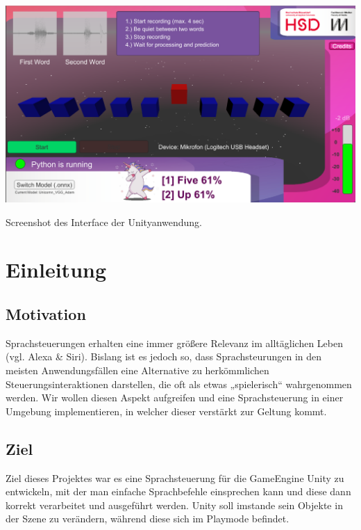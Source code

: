 \documentclass[sigconf]{acmart}
\begin{document}
\begin{teaserfigure}
  \includegraphics[width=\textwidth]{images/Demo}
  \caption{Screenshot des Interface der Unityanwendung.}
  \label{fig:UnityApp}
\end{teaserfigure}

\maketitle
\newpage
\section{Einleitung}

\subsection{Motivation}
Sprachsteuerungen erhalten eine immer größere Relevanz im alltäglichen Leben (vgl. Alexa \& Siri). Bislang ist es jedoch so, dass Sprachsteurungen in den meisten Anwendungsfällen eine Alternative zu herkömmlichen Steuerungsinteraktionen darstellen, die oft als etwas „spielerisch“ wahrgenommen werden. Wir wollen diesen Aspekt aufgreifen und eine Sprachsteuerung in einer Umgebung implementieren, in welcher dieser verstärkt zur Geltung kommt.

\subsection{Ziel}
Ziel dieses Projektes war es eine Sprachsteuerung für die GameEngine Unity zu entwickeln, mit der man einfache Sprachbefehle einsprechen kann und diese dann korrekt verarbeitet und ausgeführt werden. Unity soll imstande sein Objekte in der Szene zu verändern, während diese sich im Playmode befindet.
\end{document}
